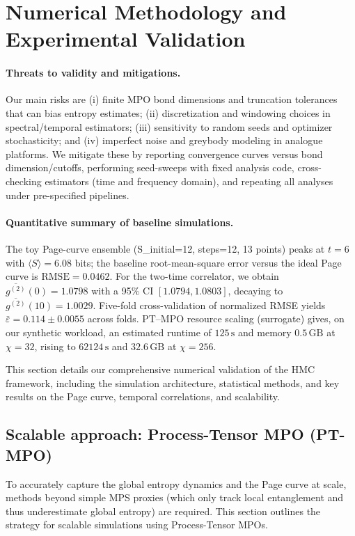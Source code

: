 \documentclass[a4paper,11pt]{article}
\newcommand{\HMC}{\textup{\textsc{HMC}}\xspace}
\theoremstyle{plain}
\theoremstyle{definition}
\theoremstyle{remark}
\begin{document}
\section{Numerical Methodology and Experimental Validation}
\label{sec:numerical_validation}
\paragraph{Threats to validity and mitigations.}
Our main risks are (i) finite MPO bond dimensions and truncation tolerances that can bias entropy estimates; (ii) discretization and windowing choices in spectral/temporal estimators; (iii) sensitivity to random seeds and optimizer stochasticity; and (iv) imperfect noise and greybody modeling in analogue platforms. We mitigate these by reporting convergence curves versus bond dimension/cutoffs, performing seed-sweeps with fixed analysis code, cross-checking estimators (time and frequency domain), and repeating all analyses under pre-specified pipelines.

\paragraph{Quantitative summary of baseline simulations.}
The toy Page-curve ensemble (S\_initial=12, steps=12, 13 points) peaks at $t=6$ with $\langle S\rangle=6.08$ bits;
the baseline root-mean-square error versus the ideal Page curve is $\mathrm{RMSE}=0.0462$.
For the two-time correlator, we obtain $\overline{g^{(2)}}(0)=1.0798$ with a 95\% CI $[1.0794,1.0803]$, decaying to
$\overline{g^{(2)}}(10)=1.0029$. Five-fold cross-validation of normalized RMSE yields
$\bar{\varepsilon}=0.114\pm0.0055$ across folds.
PT--MPO resource scaling (surrogate) gives, on our synthetic workload, an estimated runtime of $125\,\mathrm{s}$ and
memory $0.5\,\mathrm{GB}$ at $\chi=32$, rising to $62124\,\mathrm{s}$ and $32.6\,\mathrm{GB}$ at $\chi=256$.

This section details our comprehensive numerical validation of the \HMC{} framework, including the simulation architecture, statistical methods, and key results on the Page curve, temporal correlations, and scalability.

\subsection{Scalable approach: Process-Tensor MPO (PT-MPO)}
\label{ssec:ptmpo}
To accurately capture the global entropy dynamics and the Page curve at scale, methods beyond simple MPS proxies (which only track local entanglement and thus underestimate global entropy) are required. This section outlines the strategy for scalable simulations using Process-Tensor MPOs.
\end{document}
